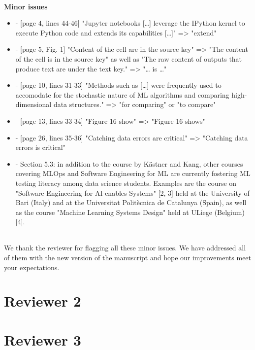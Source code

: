 \documentclass[11pt,fleqn]{article}
\newcommand{\eline}{\vspace*{.75\baselineskip}}
\newcommand{\Referee}[1]{\eline \noindent {\bf Reviewer comment #1:} \\}
\newcommand{\Us}{\eline \noindent {\bf Response:}\\}
\newcommand{\newreviewer}[1]{\section*{Reviewer #1}\vspace*{-1.05\baselineskip}}
\newenvironment{revcomment}[1][]
{\Referee{#1}\begin{rcomment}}
{\end{rcomment}}
\begin{document}
\begin{revcomment}[1.11]

\textbf{Minor issues}

\begin{itemize}

  \item - [page 4, lines 44-46] "Jupyter notebooks […] leverage the IPython kernel to execute Python code and extends its capabilities […]" => "extend"

  \item - [page 5, Fig. 1] "Content of the cell are in the source key" => "The content of the cell is in the source key" as well as "The raw content of outputs that produce text are under the text key." => "… is …"

  \item - [page 10, lines 31-33] "Methods such as […] were frequently used to accomodate for the stochastic nature of ML algorithms and comparing high-dimensional data structures." => "for comparing" or "to compare"

  \item - [page 13, lines 33-34] "Figure 16 show" => "Figure 16 shows"

  \item - [page 26, lines 35-36] "Catching data errors are critical" => "Catching data errors is critical"

  \item - Section 5.3: in addition to the course by Kästner and Kang, other courses covering MLOps and Software Engineering for ML are currently fostering ML testing literacy among data science students. Examples are the course on "Software Engineering for AI-enables Systems" [2, 3] held at the University of Bari (Italy) and at the Universitat Politècnica de Catalunya (Spain), as well as the course "Machine Learning Systems Design" held at ULiege (Belgium) [4].

\end{itemize}
\end{revcomment}

\Us We thank the reviewer for flagging all these minor issues. We have addressed all of them with the new version of the manuscript and hope our improvements meet your expectations.


\newreviewer{2}

\newreviewer{3}


\todos
\end{document}
